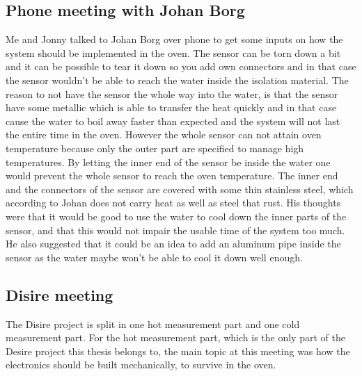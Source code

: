 \subsection{Phone meeting with Johan Borg}

Me and Jonny talked to Johan Borg over phone to get some inputs on how the system should be implemented in the oven. The sensor can be torn down a bit and it can be possible to tear it down so you add own connectors and in that case the sensor wouldn't be able to reach the water inside the isolation material. The reason to not have the sensor the whole way into the water, is that the sensor have some metallic which is able to transfer the heat quickly and in that case cause the water to boil away faster than expected and the system will not last the entire time in the oven. However the whole sensor can not attain oven temperature because only the outer part are specified to manage high temperatures. By letting the inner end of the sensor be inside the water one would prevent the whole sensor to reach the oven temperature. The inner end and the connectors of the sensor are covered with some thin stainless steel, which according to Johan does not carry heat as well as steel that rust. His thoughts were that it would be good to use the water to cool down the inner parts of the sensor, and that this would not impair the usable time of the system too much. He also suggested that it could be an idea to add an aluminum pipe inside the sensor as the water maybe won't be able to cool it down well enough.

\subsection{Disire meeting}%


The Disire project is split in one hot measurement part and one cold measurement part. For the hot measurement part, which is the only part of the Desire project this thesis belongs to, the main topic at this meeting was how the electronics should be built mechanically, to survive in the oven.

